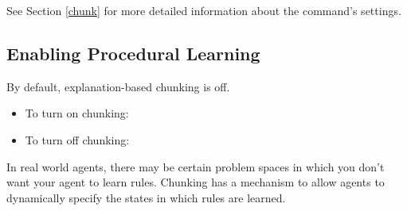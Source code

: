 See Section \ref{chunk} for more detailed information about the  command's settings.

\subsection{Enabling Procedural Learning}
\label{CHUNKING-usage-enable}

By default, explanation-based chunking is off.

\begin{itemize}
	\item To turn on chunking: 
	\item To turn off chunking: 
\end{itemize}

In real world agents, there may be certain problem spaces in which you don't want your agent to learn rules.  Chunking has a mechanism to allow agents to dynamically specify the states in which rules are learned. 

